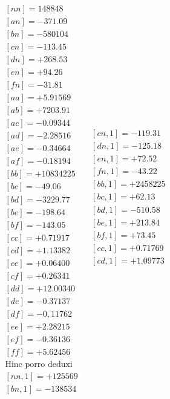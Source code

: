 {\fontsize{9}{11}\selectfont
\[
\begin{array}{lll}
\begin{gathered}{}
[nn]=148848\\
[an]=-371.09\\
[bn]=-580104\\
[cn]=-113.45\\
[dn]=+268.53\\
[en]=+94.26\\
[fn]=-31.81\\
[aa]=+5.91569\\
[ab]=+7203.91\\
[ac]=-0.09344\\
[ad]=-2.28516\\
[ae]=-0.34664\\
[af]=-0.18194\\
[bb]=+10834225\\
[bc]=-49.06\\
[bd]=-3229.77\\
[be]=-198.64\\
[bf]=-143.05\\
[cc]=+0.71917\\
[cd]=+1.13382\\
[ce]=+0.06400\\
[cf]=+0.26341\\
[dd]=+12.00340\\
[de]=-0.37137\\
[df]=-0{,}11762\\
[ee]=+2.28215\\
[ef]=-0.36136\\
[ff]=+5.62456\\[3pt]
\text{Hinc porro deduxi}\\[3pt]
[nn,1]=+125569\\
[bn,1]=-138534
\end{gathered}&
\begin{gathered}{}
[cn,1]=-119.31\\
[dn,1]=-125.18\\
[en,1]=+72.52\\
[fn,1]=-43.22\\
[bb,1]=+2458225\\
[bc,1]=+62.13\\
[bd,1]=-510.58\\
[be,1]=+213.84\\
[bf,1]=+73.45\\
[cc,1]=+0.71769\\
[cd,1]=+1.09773\\

\end{gathered}
\end{array}\]}
